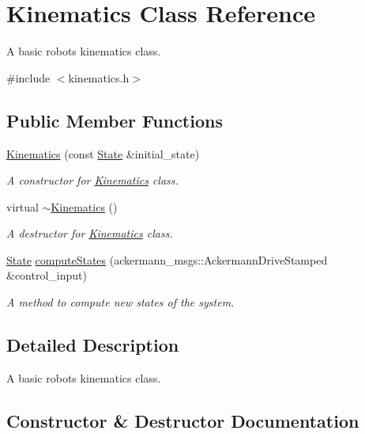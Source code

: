 \hypertarget{classKinematics}{}\section{Kinematics Class Reference}
\label{classKinematics}


A basic robot\textquotesingle{}s kinematics class.  




{\ttfamily \#include $<$kinematics.\+h$>$}

\subsection*{Public Member Functions}
\begin{DoxyCompactItemize}
\item 
\hyperlink{classKinematics_adb48748237fe9076e7d8aac5b435e95f}{Kinematics} (const \hyperlink{structState}{State} \&initial\+\_\+state)
\begin{DoxyCompactList}\small\item\em A constructor for \hyperlink{classKinematics}{Kinematics} class. \end{DoxyCompactList}\item 
\mbox{\label{classKinematics_ae84a8ae43ee20a8573f7e51471d159b5}} 
virtual \hyperlink{classKinematics_ae84a8ae43ee20a8573f7e51471d159b5}{$\sim$\+Kinematics} ()
\begin{DoxyCompactList}\small\item\em A destructor for \hyperlink{classKinematics}{Kinematics} class. \end{DoxyCompactList}\item 
\hyperlink{structState}{State} \hyperlink{classKinematics_abc359954c01ed158fe090e01b5539f06}{compute\+States} (ackermann\+\_\+msgs\+::\+Ackermann\+Drive\+Stamped \&control\+\_\+input)
\begin{DoxyCompactList}\small\item\em A method to compute new states of the system. \end{DoxyCompactList}\end{DoxyCompactItemize}


\subsection{Detailed Description}
A basic robot\textquotesingle{}s kinematics class. 

\subsection{Constructor \& Destructor Documentation}
\mbox{\label{classKinematics_adb48748237fe9076e7d8aac5b435e95f}} 
